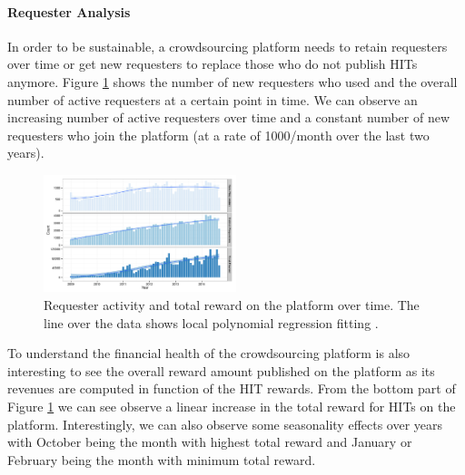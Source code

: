 \paragraph{Requester Analysis}
In order to be sustainable, a crowdsourcing platform needs to retain requesters over time or get new requesters to replace those who do not publish HITs anymore. Figure \ref{fig:requesters_reward} shows the number of new requesters who used \amt{} and the overall number of active requesters at a certain point in time. We can observe an increasing number of active requesters over time and a constant number of new requesters who join the platform (at a rate of 1000/month over the last two years).

\begin{figure}[htbp]
	\centering
		\includegraphics[width=0.5\textwidth]{figures/requesters_reward}
	\caption{Requester activity and total reward on the platform over time. The line over the data shows local polynomial regression fitting \cite{cleveland1992local}.}
	\label{fig:requesters_reward}
\end{figure}

To understand the financial health of the crowdsourcing platform is also interesting to see the overall reward amount published on the platform as its revenues are computed in function of the HIT rewards. From the bottom part of Figure \ref{fig:requesters_reward} we can see observe a linear increase in the total reward for HITs on the platform. Interestingly, we can also observe some seasonality effects over years with October being the month with highest total reward and January or February being the month with minimum total reward.


